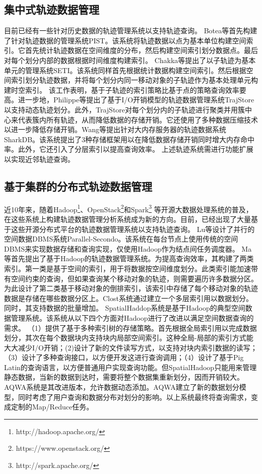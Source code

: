 \subsection{集中式轨迹数据管理}
目前已经有一些针对历史数据的轨迹管理系统以支持轨迹查询\cite{BoteaMNS08,ChakkaEP03,Cudre-MaurouxWM10}。
Botea等首先构建了针对轨迹数据的管理系统PIST\cite{BoteaMNS08}。该系统将轨迹数据以点为基本单位构建空间索引。它首先统计轨迹数据在空间维度的分布，然后构建空间索引划分数据点。最后对每个划分内部的数据根据时间维度构建索引。
Chakka等提出了以子轨迹为基本单元的管理系统SETI\cite{ChakkaEP03}。该系统同样首先根据统计数据构建空间索引。然后根据空间索引划分轨迹数据，并将每个划分内同一移动对象的子轨迹作为基本处理单元构建时空索引。
该工作表明，基于子轨迹的索引策略比基于点的策略查询效率要高。进一步地，Philippe等提出了基于I/O开销模型的轨迹数据管理系统TrajStore以支持动态轨迹划分\cite{Cudre-MaurouxWM10}。此外，TrajStore对每个划分内的子轨迹进行聚类并用簇中心来代表簇内所有轨迹，从而降低数据的存储开销。它还使用了多种数据压缩技术以进一步降低存储开销。Wang等提出针对大内存服务器的轨迹数据系统SharkDB\cite{WangZZS15,WangZXZZS14,ZhengWZSLS18}。该系统提出了3种存储框架用以在降低数据存储开销同时增大内存命中率。此外，它还引入了分层索引以提高查询效率。
上述轨迹系统需进行功能扩展以实现近邻轨迹查询。

\subsection{基于集群的分布式轨迹数据管理}

近10年来，随着Hadoop\footnote{http://hadoop.apache.org/}、OpenStack\footnote{https://www.openstack.org/}和Spark\footnote{http://spark.apache.org/}
等开源大数据处理系统的普及，在这些系统上构建轨迹数据管理分析系统成为新的方向。目前，已经出现了大量基于这些开源分布式平台的轨迹数据管理系统以支持轨迹查询。
Lu等设计了并行的空间数据DBMS系统Parallel-Secondo\cite{LuG12}。该系统在每台节点上使用传统的空间DBMS来实现数据存储和查询实现，仅使用Hadoop作为结点间任务调度器。
Ma等首先提出了基于Hadoop的轨迹数据管理系统\cite{MaYQZ09,YangMQZ09}。为提高查询效率，其构建了两类索引。第一类是基于空间的索引，用于将数据按空间维度划分。此类索引能加速带有空间约束的查询，但如果查询某个移动对象的轨迹，则需要遍历许多数据分区。为此设计了第二类基于移动对象的倒排索引，该索引中存储了每个移动对象的轨迹数据是存储在哪些数据分区上。Clost\cite{TanLN12}系统通过建立一个多层索引用以数据划分。同时，其支持数据的批量增加。
SpatialHaddop\cite{SpatialHadoop}系统是基于Hadoop的典型空间数据管理系统。该系统从以下四个方面对Hadoop进行了改进以满足空间数据查询的需求。
（1）提供了基于多种索引树的存储策略。首先根据全局索引用以完成数据划分，其次在每个数据块内支持块内局部空间索引。这种全局-局部的索引方式能大大减少I/O开销；(2)设计了新的文件读写方式，以支持对块内索引数据的读写；（3）设计了多种查询接口，以方便开发这进行查询调用；（4）设计了基于Pig Latin的查询语言，以方便普通用户实现查询功能。但SpatialHadoop只能用来管理静态数据，当新的数据到达时，需要将整个数据集重新划分，因而开销较大。
AQWA\cite{AlyMHAOEQ15}系统是其改进版本，允许数据动态添加。AQWA建立了新的数据划分模型，同时考虑了用户查询和数据分布对划分的影响。以上系统最终将查询需求，变成定制的Map/Reduce\cite{DeanG04,mapreduce}任务。


